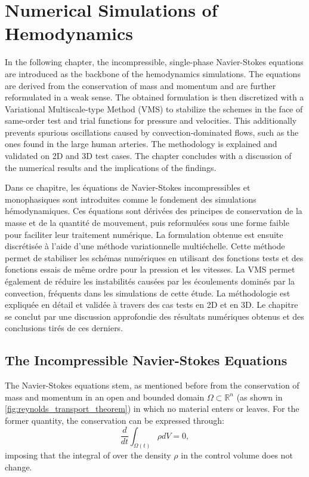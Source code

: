 \newpage
\pagestyle{fancy}

\chapter{Numerical Simulations of Hemodynamics}
\minitoc

\begin{tcolorbox}[abstract]

	In the following chapter, the incompressible, single-phase Navier-Stokes equations are introduced as the backbone of the hemodynamics simulations. The equations are derived from the conservation of mass and momentum and are further reformulated in a weak sense. The obtained formulation is then discretized with a Variational Multiscale-type Method (VMS) to stabilize the schemes in the face of same-order test and trial functions for pressure and velocities. This additionally prevents spurious oscillations caused by convection-dominated flows, such as the ones found in the large human arteries. The methodology is explained and validated on 2D and 3D test cases. The chapter concludes with a discussion of the numerical results and the implications of the findings.

	\tcblower

	Dans ce chapitre, les équations de Navier-Stokes incompressibles et monophasiques sont introduites comme le fondement des simulations hémodynamiques. Ces équations sont dérivées des principes de conservation de la masse et de la quantité de mouvement, puis reformulées sous une forme faible pour faciliter leur traitement numérique. La formulation obtenue est ensuite discrétisée à l'aide d'une méthode variationnelle multiéchelle. Cette méthode permet de stabiliser les schémas numériques en utilisant des fonctions tests et des fonctions essais de même ordre pour la pression et les vitesses. La VMS permet également de réduire les instabilités causées par les écoulements dominés par la convection, fréquents dans les simulations de cette étude. La méthodologie est expliquée en détail et validée à travers des cas tests en 2D et en 3D. Le chapitre se conclut par une discussion approfondie des résultats numériques obtenus et des conclusions tirés de ces derniers.

\end{tcolorbox}

\section{The Incompressible Navier-Stokes Equations}
The Navier-Stokes equations stem, as mentioned before from the conservation of mass and momentum in an open and bounded domain $\Omega \subset \mathbb {R}^{n}$ (as shown in \autoref{fig:reynolds_transport_theorem}) in which no material enters or leaves. For the former quantity, the conservation can be expressed through:
\begin{equation*}
	\frac{d}{dt} \int_{\Omega(t)} \rho dV = 0,
\end{equation*}
imposing that the integral of over the density $\rho$ in the control volume does not change.

